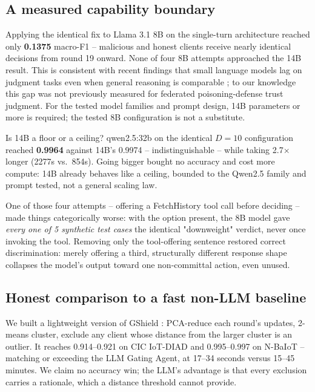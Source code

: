 \documentclass[conference]{IEEEtran}
\begin{document}
\subsection{A measured capability boundary}
Applying the identical fix to Llama 3.1 8B on the single-turn architecture reached only \textbf{0.1375} macro-F1 -- malicious and honest clients receive nearly identical decisions from round 19 onward. None of four 8B attempts approached the 14B result. This is consistent with recent findings that small language models lag on judgment tasks even when general reasoning is comparable \cite{laddha2026slmjury,bi2025judgeboard}; to our knowledge this gap was not previously measured for federated poisoning-defense trust judgment. For the tested model families and prompt design, 14B parameters or more is required; the tested 8B configuration is not a substitute.

Is 14B a floor or a ceiling? qwen2.5:32b on the identical $D{=}10$ configuration reached \textbf{0.9964} against 14B's 0.9974 -- indistinguishable -- while taking 2.7$\times$ longer (2277s vs.\ 854s). Going bigger bought no accuracy and cost more compute: 14B already behaves like a ceiling, bounded to the Qwen2.5 family and prompt tested, not a general scaling law.

One of those four attempts -- offering a FetchHistory tool call before deciding -- made things categorically worse: with the option present, the 8B model gave \emph{every one of 5 synthetic test cases} the identical "downweight" verdict, never once invoking the tool. Removing only the tool-offering sentence restored correct discrimination: merely offering a third, structurally different response shape collapses the model's output toward one non-committal action, even unused.

\subsection{Honest comparison to a fast non-LLM baseline}
We built a lightweight version of GShield \cite{sameera2025gshield}: PCA-reduce each round's updates, 2-means cluster, exclude any client whose distance from the larger cluster is an outlier. It reaches 0.914--0.921 on CIC IoT-DIAD and 0.995--0.997 on N-BaIoT -- matching or exceeding the LLM Gating Agent, at 17--34 seconds versus 15--45 minutes. We claim no accuracy win; the LLM's advantage is that every exclusion carries a rationale, which a distance threshold cannot provide.
\end{document}
